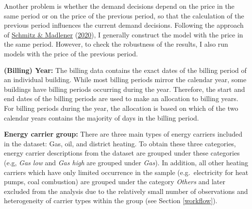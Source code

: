 \documentclass[12pt,twoside]{reedthesis}
\begin{document}
Another problem is whether the demand decisions depend on the price in the same period or on the price of the previous period, so that the calculation of the previous period influences the current demand decisions. Following the approach of \protect\hyperlink{ref-schmitz_madlener20}{Schmitz \& Madlener} (\protect\hyperlink{ref-schmitz_madlener20}{2020}), I generally construct the model with the price in the same period. However, to check the robustness of the results, I also run models with the price of the previous period.

\textbf{(Billing) Year:} The billing data contains the exact dates of the billing period of an individual building. While most billing periods mirror the calendar year, some buildings have billing periods occurring during the year. Therefore, the start and end dates of the billing periods are used to make an allocation to billing years. For billing periods during the year, the allocation is based on which of the two calendar years contains the majority of days in the billing period.

\textbf{Energy carrier group:} There are three main types of energy carriers included in the dataset: Gas, oil, and district heating. To obtain these three categories, energy carrier descriptions from the dataset are grouped under these categories (e.g, \emph{Gas low} and \emph{Gas high} are grouped under \emph{Gas}). In addition, all other heating carriers which have only limited occurrence in the sample (e.g.~electricity for heat pumps, coal combustion) are grouped under the category \emph{Others} and later excluded from the analysis due to the relatively small number of observations and heterogeneity of carrier types within the group (see Section \ref{workflow}).
\end{document}
